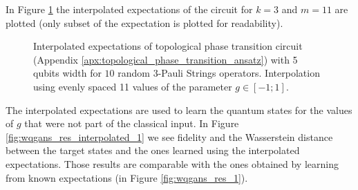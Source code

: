 In Figure \ref{fig:phase_exps} the interpolated expectations of the circuit for
$k=3$ and $m=11$ are plotted (only subset of the expectation is plotted for readability).

\begin{figure}[htbp!]
  \captionsetup[subfigure]{labelformat=empty}
  \centering
  \caption{Interpolated expectations of topological phase transition circuit (Appendix
    \ref{apx:topological_phase_transition_ansatz}) with 5 qubits width for $10$
    random 3-Pauli Strings operators. Interpolation using evenly
    spaced 11 values of the parameter $g \in [-1; 1]$. 
  }
  \label{fig:phase_exps}
\end{figure}

The interpolated expectations are used to learn the quantum states for
the values of $g$ that were not part of the classical input. In Figure
\ref{fig:wqgans_res_interpolated_1} we see fidelity and the Wasserstein distance
between the target states and the ones learned using the interpolated
expectations.
Those results are comparable with the ones obtained by learning from known
expectations (in Figure \ref{fig:wqgans_res_1}).

